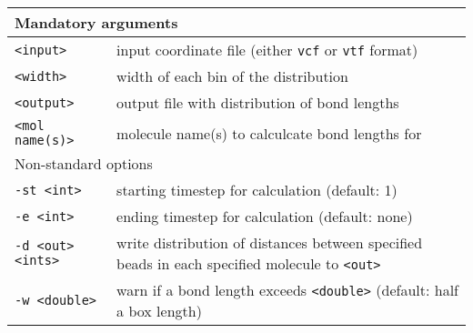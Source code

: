 \noindent
\begin{longtable}{p{}p{}}
  \toprule
  \multicolumn{2}{l}{Mandatory arguments} \\
  \midrule
  \texttt{<input>} & input coordinate file (either \texttt{vcf} or
    \texttt{vtf} format) \\
  \texttt{<width>} & width of each bin of the distribution \\
  \texttt{<output>} & output file with distribution of bond lengths \\
  \texttt{<mol name(s)>} & molecule name(s) to calculcate bond lengths for \\
  \toprule
  \multicolumn{2}{l}{Non-standard options} \\
  \midrule
  \texttt{-st <int>} & starting timestep for calculation (default: 1) \\
  \texttt{-e <int>} & ending timestep for calculation (default: none) \\
  \texttt{-d <out> <ints>} & write distribution of distances
    between specified beads in each specified molecule to \texttt{<out>}\\
  \texttt{-w <double>} & warn if a bond length exceeds \texttt{<double>}
    (default: half a box length)\\
  \bottomrule
\end{longtable}

